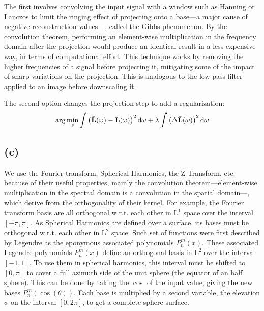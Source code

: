 \documentclass{report}
\begin{document}
The first involves convolving the input signal with a window such as Hanning or Lanczos to limit the ringing effect of projecting onto a base---a major cause of negative reconstruction values---, called the Gibbs phenomenon. By the convolution theorem, performing an element-wise multiplication in the frequency domain after the projection would produce an identical result in a less expensive way, in terms of computational effort. This technique works by removing the higher frequencies of a signal before projecting it, mitigating some of the impact of sharp variations on the projection. This is analogous to the low-pass filter applied to an image before downscaling it.

The second option changes the projection step to add a regularization:
\begin{equation}
\arg \min_s \int\left( \bar{\mathbf{L}}(\omega) - \mathbf{L}(\omega)\right)^2 \mathrm{d}\omega + \lambda \int \left(\Delta \bar{\mathbf{L}}(\omega)\right)^2 \mathrm{d}\omega
\end{equation}

\subsection{(c)}

We use the Fourier transform, Spherical Harmonics, the Z-Transform, etc. because of their useful properties, mainly the convolution theorem---element-wise multiplication in the spectral domain is a convolution in the spatial domain---, which derive from the orthogonality of their kernel. For example, the Fourier transform basis are all orthogonal w.r.t. each other in $\mathrm{L}^1$ space over the interval $\left[-\pi, \pi\right]$. As Spherical Harmonics are defined over a surface, its bases must be orthogonal w.r.t. each other in $\mathrm{L}^2$ space. Such set of functions were first described by Legendre as the eponymous associated polynomials $P_n^m(x)$. These associated Legendre polynomials $P_n^m(x)$ define an orthogonal basis in $\mathrm{L}^2$ over the interval $\left[ -1, 1 \right]$. To use them in spherical harmonics, this interval must be shifted to $\left[ 0, \pi \right]$ to cover a full azimuth side of the unit sphere (the equator of an half sphere). This can be done by taking the $\cos$ of the input value, giving the new bases $P_n^m\left(\cos(\theta)\right)$. Each base is multiplied by a second variable, the elevation $\phi$ on the interval $\left[ 0, 2\pi \right]$, to get a complete sphere surface.
\end{document}
